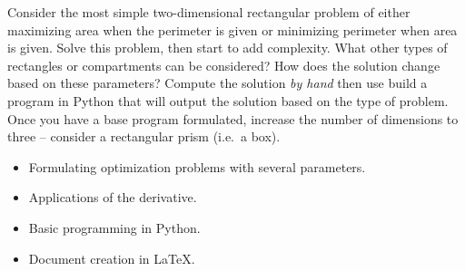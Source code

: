 \documentclass[article, 11pt]{article}
\begin{document}
\vspace{-.35cm}
\noindent \hrulefill

Consider the most simple two-dimensional rectangular problem of either maximizing area when the perimeter is given or minimizing perimeter when area is given.  Solve this problem, then start to add complexity.  What other types of rectangles or compartments can be considered?  How does the solution change based on these parameters?  Compute the solution \textit{by hand} then use build a program in Python that will output the solution based on the type of problem.  Once you have a base program formulated, increase the number of dimensions to three -- consider a rectangular prism (i.e.~a box).   \\

\noindent {}

\vspace{-.35cm}
\noindent \hrulefill

\begin{itemize}
	\item Formulating optimization problems with several parameters.  
	\item Applications of the derivative.  
	\item Basic programming in Python. 
	\item Document creation in \LaTeX. 
\end{itemize}

\noindent \hrulefill
\end{document}
